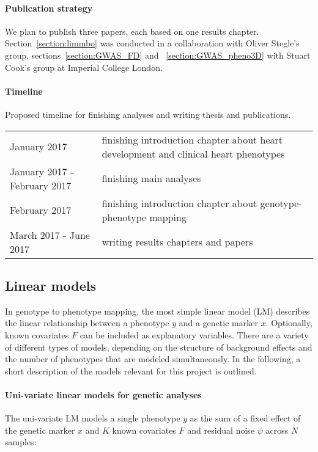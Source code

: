 \paragraph{Publication strategy}
We plan to publish three papers, each based on one results chapter. Section~\ref{section:limmbo} was conducted in a collaboration with Oliver Stegle's group, sections~\ref{section:GWAS_FD} and ~\ref{section:GWAS_pheno3D} with Stuart Cook's group at Imperial College London. 

\newpage
\paragraph{Timeline} Proposed timeline for finishing analyses and writing thesis and publications.
\begin{table}[h!]
  \centering
    \begin{tabular}{p{7cm}p{8cm}}
    	\toprule
    	January 2017  & finishing introduction chapter about heart development and clinical heart phenotypes\\
    	January 2017 - February 2017 & finishing main analyses\\
    	February 2017  & finishing introduction chapter about genotype-phenotype mapping\\
     	March 2017 - June 2017 & writing results chapters and papers\\
    	\bottomrule
    \end{tabular}%
  \label{tab:genoOverview}%
\end{table}%



\subsection{Linear models}
In genotype to phenotype mapping, the most simple linear model (LM) describes the linear relationship between a phenotype \(y\) and a genetic marker \(x\). Optionally, known covariates \(F\) can be included as explanatory variables. There are a variety of different types of models, depending on the structure of background effects and the number of phenotypes that are modeled simultaneously. In the following, a short description of the models relevant for this project is outlined. 

\label{sec:ssection:lm}
\paragraph{Uni-variate linear models for genetic analyses}
The uni-variate LM models a single phenotype \(y\) as the sum of a fixed effect of the genetic marker \(x\) and \(K\) known covariates \(F\) and residual noise \(\psi\) across \(N\) samples:


